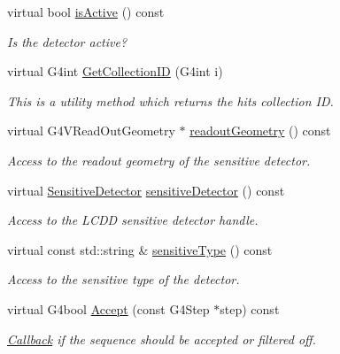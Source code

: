 \begin{DoxyCompactItemize}
virtual bool \hyperlink{class_d_d4hep_1_1_simulation_1_1_geant4_sens_det_a317a03e948f5b1cace52ed1ec8600292}{is\+Active} () const
\begin{DoxyCompactList}\small\item\em Is the detector active? \end{DoxyCompactList}\item 
virtual G4int \hyperlink{class_d_d4hep_1_1_simulation_1_1_geant4_sens_det_acabf73f9ac2fd034b02bb24d12db8347}{Get\+Collection\+ID} (G4int i)
\begin{DoxyCompactList}\small\item\em This is a utility method which returns the hits collection ID. \end{DoxyCompactList}\item 
virtual G4\+V\+Read\+Out\+Geometry $\ast$ \hyperlink{class_d_d4hep_1_1_simulation_1_1_geant4_sens_det_a37cc84389484532daeb6fd0b28b53ca6}{readout\+Geometry} () const
\begin{DoxyCompactList}\small\item\em Access to the readout geometry of the sensitive detector. \end{DoxyCompactList}\item 
virtual \hyperlink{class_d_d4hep_1_1_simulation_1_1_geant4_action_s_d_a8a292947ea3f9b419728ef729a7e3fae}{Sensitive\+Detector} \hyperlink{class_d_d4hep_1_1_simulation_1_1_geant4_sens_det_ada24f1cfac58e4f10581e1855eda59f0}{sensitive\+Detector} () const
\begin{DoxyCompactList}\small\item\em Access to the L\+C\+DD sensitive detector handle. \end{DoxyCompactList}\item 
virtual const std\+::string \& \hyperlink{class_d_d4hep_1_1_simulation_1_1_geant4_sens_det_a90e504184bd398b1df950000c6aa3b8a}{sensitive\+Type} () const
\begin{DoxyCompactList}\small\item\em Access to the sensitive type of the detector. \end{DoxyCompactList}\item 
virtual G4bool \hyperlink{class_d_d4hep_1_1_simulation_1_1_geant4_sens_det_a2283761cd59731dac3f113b3bf26bf9d}{Accept} (const G4\+Step $\ast$step) const
\begin{DoxyCompactList}\small\item\em \hyperlink{class_d_d4hep_1_1_callback}{Callback} if the sequence should be accepted or filtered off. \end{DoxyCompactList}\item 

\end{DoxyCompactItemize}
